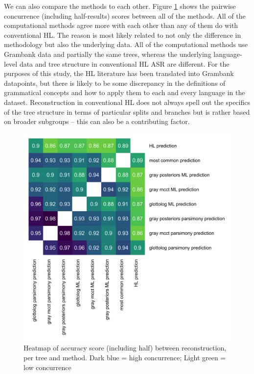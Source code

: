 \documentclass[12pt,letterpaper]{article}
\begin{document}
We can also compare the methods to each other. Figure \ref{heatmap_accuracy_score_methods} shows the pairwise concurrence (including half-results) scores between all of the methods. All of the computational methods agree more with each other than any of them do with conventional HL. The reason is most likely related to not only the difference in methodology but also the underlying data. All of the computational methods use Grambank data and partially the same trees, whereas the underlying language-level data and tree structure in conventional HL ASR are different. For the purposes of this study, the HL literature has been translated into Grambank datapoints, but there is likely to be some discrepancy in the definitions of grammatical concepts and how to apply them to each and every language in the dataset. Reconstruction in conventional HL does not always spell out the specifics of the tree structure in terms of particular splits and branches but is rather based on broader subgroups -- this can also be a contributing factor.


\begin{figure}[ht]
\centering
\includegraphics[width=17cm]{illustrations/plots_from_R/results/dist_heatmap_all_methods.png}
\caption{Heatmap of accuracy score (including half) between reconstruction, per tree and method. Dark blue = high concurrence; Light green = low concurrence}
\label{heatmap_accuracy_score_methods}
\end{figure}
\end{document}
